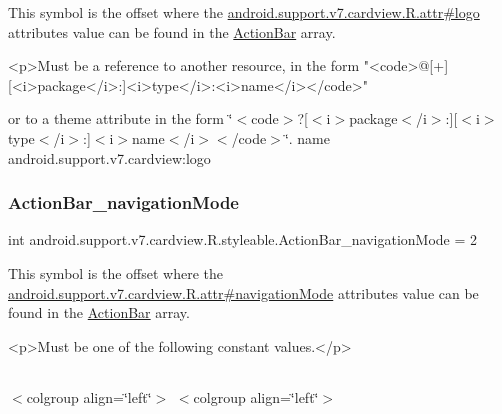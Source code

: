 This symbol is the offset where the \hyperlink{classandroid_1_1support_1_1v7_1_1cardview_1_1R_1_1attr_ad7f81cd76bf157d46c8917cf4d3d886c}{android.\+support.\+v7.\+cardview.\+R.\+attr\#logo} attribute\textquotesingle{}s value can be found in the \hyperlink{classandroid_1_1support_1_1v7_1_1cardview_1_1R_1_1styleable_a0cbf7f776e31f78bb0a2b558daf176f8}{Action\+Bar} array.

\begin{DoxyVerb}      <p>Must be a reference to another resource, in the form "<code>@[+][<i>package</i>:]<i>type</i>:<i>name</i></code>"
\end{DoxyVerb}
 or to a theme attribute in the form \char`\"{}$<$code$>$?\mbox{[}$<$i$>$package$<$/i$>$\+:\mbox{]}\mbox{[}$<$i$>$type$<$/i$>$\+:\mbox{]}$<$i$>$name$<$/i$>$$<$/code$>$\char`\"{}.  name android.\+support.\+v7.\+cardview\+:logo \mbox{\label{classandroid_1_1support_1_1v7_1_1cardview_1_1R_1_1styleable_a323805477eb8f8741417f8383c1f14e2}} 
\subsubsection{\texorpdfstring{Action\+Bar\+\_\+navigation\+Mode}{ActionBar\_navigationMode}}
{\footnotesize\ttfamily int android.\+support.\+v7.\+cardview.\+R.\+styleable.\+Action\+Bar\+\_\+navigation\+Mode = 2\hspace{0.3cm}{\ttfamily [static]}}

This symbol is the offset where the \hyperlink{classandroid_1_1support_1_1v7_1_1cardview_1_1R_1_1attr_a2e22dbe20931048f60b82a6a397e1626}{android.\+support.\+v7.\+cardview.\+R.\+attr\#navigation\+Mode} attribute\textquotesingle{}s value can be found in the \hyperlink{classandroid_1_1support_1_1v7_1_1cardview_1_1R_1_1styleable_a0cbf7f776e31f78bb0a2b558daf176f8}{Action\+Bar} array.

\begin{DoxyVerb}      <p>Must be one of the following constant values.</p>
\end{DoxyVerb}
 \tabulinesep=1mm
\begin{longtabu} spread 0pt [c]{*{0}{|X[-1]}|}
\hline
\end{longtabu}
$<$colgroup align=\char`\"{}left\char`\"{}$>$ $<$colgroup align=\char`\"{}left\char`\"{}$>$ 

